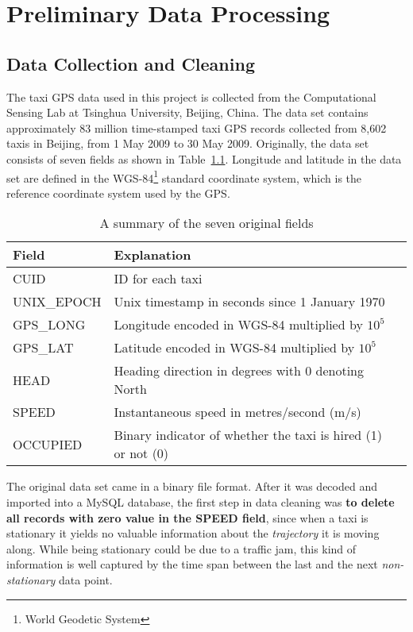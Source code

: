 \chapter{Preliminary Data Processing}\label{Chap:2}
\section{Data Collection and Cleaning}
The taxi GPS data used in this project is collected from the Computational Sensing Lab \cite{BPLL13} at Tsinghua University, Beijing, China. The data set contains approximately 83 million time-stamped taxi GPS records collected from 8,602 taxis in Beijing, from 1 May 2009 to 30 May 2009. Originally, the data set consists of seven fields as shown in Table~\ref{Ta:orig_field}. Longitude and latitude in the data set are defined in the WGS-84\footnote{World Geodetic System} standard coordinate system, which is the reference coordinate system used by the GPS.

\begin{table}[h!]
\centering
\begin{tabular}{ | l | l | l | }
\hline
\textbf{Field} & \textbf{Explanation} \\ \hline
CUID & ID for each taxi \\ \hline
UNIX\_EPOCH & Unix timestamp in seconds since 1 January 1970\\ \hline
GPS\_LONG & Longitude encoded in WGS-84 multiplied by $10^{5}$\\ \hline
GPS\_LAT & Latitude encoded in WGS-84 multiplied by $10^{5}$ \\ \hline
HEAD & Heading direction in degrees with 0 denoting North\\ \hline
SPEED & Instantaneous speed in metres/second (m/s)\\ \hline
OCCUPIED & Binary indicator of whether the taxi is hired (1) or not (0)\\ \hline
\end{tabular}
\caption{A summary of the seven original fields}\label{Ta:orig_field}
\end{table}

The original data set came in a binary file format. After it was decoded and imported into a MySQL database, the first step in data cleaning was \textbf{to delete all records with zero value in the SPEED field}, since when a taxi is stationary it yields no valuable information about the \emph{trajectory} it is moving along. While being stationary could be due to a traffic jam, this kind of information is well captured by the time span between the last and the next \emph{non-stationary} data point. 

